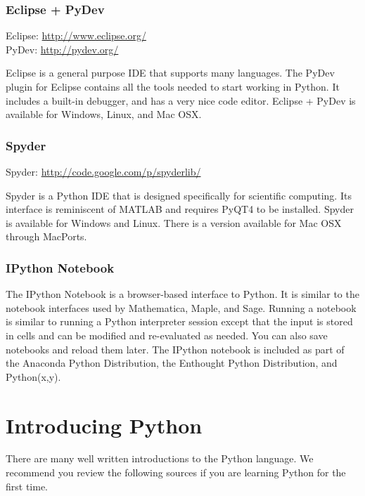 \subsubsection*{Eclipse + PyDev}

Eclipse: \url{http://www.eclipse.org/} \\
PyDev: \url{http://pydev.org/}

Eclipse is a general purpose IDE that supports many languages.
The PyDev plugin for Eclipse contains all the tools needed to start working in Python.
It includes a built-in debugger, and has a very nice code editor.
Eclipse + PyDev is available for Windows, Linux, and Mac OSX.

\subsubsection*{Spyder}

Spyder: \url{http://code.google.com/p/spyderlib/}

Spyder is a Python IDE that is designed specifically for scientific computing.
Its interface is reminiscent of MATLAB and requires PyQT4 to be installed.
Spyder is available for Windows and Linux.
There is a version available for Mac OSX through MacPorts.

\subsubsection*{IPython Notebook}
The IPython Notebook is a browser-based interface to Python.
It is similar to the notebook interfaces used by Mathematica, Maple, and Sage.
Running a notebook is similar to running a Python interpreter session except that
the input is stored in cells and can be modified and re-evaluated as needed.
You can also save notebooks and reload them later.
The IPython notebook is included as part of the Anaconda Python Distribution, the
Enthought Python Distribution, and Python(x,y).

\section*{Introducing Python}
There are many well written introductions to the Python language.
We recommend you review the following sources if you are learning Python for the
first time.

